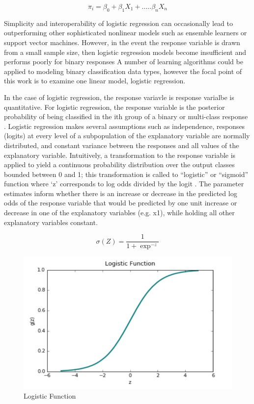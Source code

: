 \documentclass{llncs}
\begin{document}
\begin{equation}
\pi_{i} = \beta_{0} + \beta_{1}X_{1} + .....\beta_{n}X_{n}
\end{equation}


\noindent 
Simplicity and interoperability of logistic regression can occasionally lead to outperforming other sophisticated nonlinear models such as ensemble learners or support vector machines. However, in the event the response variable is drawn from a small sample size, then logistic regression models become insufficient and performs poorly for binary responses A number of learning algorithms could be applied to modeling binary classification data types, however the focal point of this work is to examine one linear model, logistic regression. 
 
 
 \noindent 
In the case of logistic regression, the response variavle is response varialbe is quantitative. For logistic regression, the response variable is the posterior probability of being classified in the ith group of a binary or multi-class response \cite{hastie}. Logistic regression makes several assumptions such as independence, responses (logits) at every level of a subpopulation of the explanatory variable are normally distributed, and constant variance between the responses and all values of the explanatory variable. Intuitively, a transformation to the response variable is applied to yield a continuous probability distribution over the output classes bounded between 0 and 1; this transformation is called to “logistic” or “sigmoid” function where ‘z’ corresponds to log odds divided by the logit \cite{ng}. The parameter estimates inform whether there is an increase or decrease in the predicted log odds of the response variable that would be predicted by one unit increase or decrease in one of the explanatory variables (e.g. x1), while holding all other explanatory variables constant.

\begin{equation}
\sigma(Z) = \frac{1}{1+\exp^{-z}}
\end{equation}


\begin{figure}
\centering
\includegraphics[scale=1.0]{sigmoid.png}
\caption{Logistic Function}
\end{figure}
\end{document}
